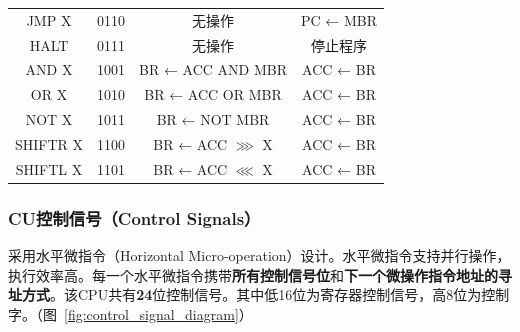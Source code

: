 \documentclass[lang=cn,a4paper,newtx]{elegantpaper}
\begin{document}
\begin{longtable}{cccc}
  JMP X & 0110 &
  
  无操作 & 
  PC ← MBR \\

  HALT & 0111 &
  
  无操作 & 
  停止程序 \\

  
  \midrule
  AND X & 1001 &
  
  BR ← ACC AND MBR &
  ACC ← BR \\

  OR X & 1010 &
  
  BR ← ACC OR MBR &
  ACC ← BR \\

  NOT X & 1011 &

  BR ← NOT MBR &
  ACC ← BR \\

  SHIFTR X & 1100 &
  
  BR ← ACC $\ggg $ X &
  ACC ← BR \\

  SHIFTL X & 1101 &
  
  BR ← ACC $\lll$ X &
  ACC ← BR \\

\end{longtable}
\subsubsection{CU控制信号（Control Signals）}\label{sec:datapath}
采用水平微指令（Horizontal Micro-operation）设计。水平微指令支持并行操作，执行效率高。每一个水平微指令携带\textbf{所有控制信号位}和\textbf{下一个微操作指令地址的寻址方式}。该CPU共有\textbf{24}位控制信号。其中低16位为寄存器控制信号，高8位为控制字。（图~\ref{fig:control_signal_diagram}）
\end{document}
